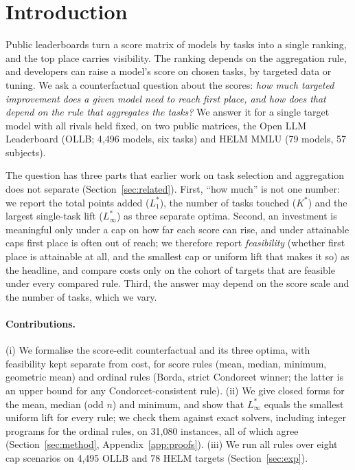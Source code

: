 \section{Introduction}
\label{sec:intro}

Public leaderboards turn a score matrix of models by tasks into a single ranking, and the top place carries visibility.
The ranking depends on the aggregation rule, and developers can raise a model's score on chosen tasks, by targeted data or tuning.
We ask a counterfactual question about the scores: \emph{how much targeted improvement does a given model need to reach first place, and how does that depend on the rule that aggregates the tasks?}
We answer it for a single target model with all rivals held fixed, on two public matrices, the Open LLM Leaderboard (OLLB; 4{,}496 models, six tasks) and HELM MMLU (79 models, 57 subjects).

The question has three parts that earlier work on task selection and aggregation does not separate (Section~\ref{sec:related}).
First, ``how much'' is not one number: we report the total points added ($L_1^\ast$), the number of tasks touched ($K^\ast$) and the largest single-task lift ($L_\infty^\ast$) as three separate optima.
Second, an investment is meaningful only under a cap on how far each score can rise, and under attainable caps first place is often out of reach; we therefore report \emph{feasibility} (whether first place is attainable at all, and the smallest cap or uniform lift that makes it so) as the headline, and compare costs only on the cohort of targets that are feasible under every compared rule.
Third, the answer may depend on the score scale and the number of tasks, which we vary.

\paragraph{Contributions.}
(i) We formalise the score-edit counterfactual and its three optima, with feasibility kept separate from cost, for score rules (mean, median, minimum, geometric mean) and ordinal rules (Borda, strict Condorcet winner; the latter is an upper bound for any Condorcet-consistent rule).
(ii) We give closed forms for the mean, median (odd $n$) and minimum, and show that $L_\infty^\ast$ equals the smallest uniform lift for every rule; we check them against exact solvers, including integer programs for the ordinal rules, on 31{,}080 instances, all of which agree (Section~\ref{sec:method}, Appendix~\ref{app:proofs}).
(iii) We run all rules over eight cap scenarios on 4{,}495 OLLB and 78 HELM targets (Section~\ref{sec:exp}).

